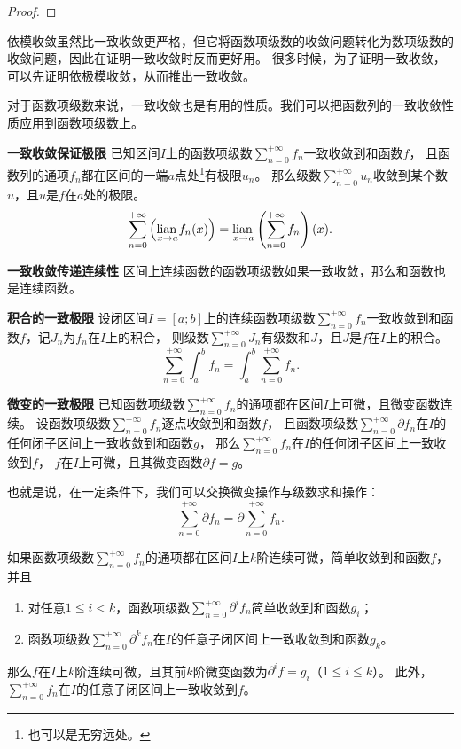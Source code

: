 \documentclass[12pt,UTF8,fontset=none]{ctexbook}
\begin{document}
\begin{appendix}
\begin{proof}
\end{proof}

依模收敛虽然比一致收敛更严格，但它将函数项级数的收敛问题转化为数项级数的收敛问题，因此在证明一致收敛时反而更好用。
很多时候，为了证明一致收敛，可以先证明依极模收敛，从而推出一致收敛。

对于函数项级数来说，一致收敛也是有用的性质。我们可以把函数列的一致收敛性质应用到函数项级数上。

\begin{tm}{\textbf{一致收敛保证极限}}
    已知区间$I$上的函数项级数$\sum_{n=0}^{+\infty} f_n$一致收敛到和函数$f$，
    且函数列的通项$f_n$都在区间的一端$a$点处\footnote{也可以是无穷远处。}有极限$u_n$。
    那么级数$\sum_{n=0}^{+\infty} u_n$收敛到某个数$u$，且$u$是$f$在$a$处的极限。
    $$ \sum_{n=0}^{+\infty} \left(\underset{x\to a}{\operatorname{lian}\,} f_n(x) \right) = \underset{x\to a}{\operatorname{lian}\,} \left(\sum_{n=0}^{+\infty} f_n\right)(x). $$
\end{tm}

\begin{tm}{\textbf{一致收敛传递连续性}}
    区间上连续函数的函数项级数如果一致收敛，那么和函数也是连续函数。
\end{tm}

\begin{tm}{\textbf{积合的一致极限}}
    设闭区间$I=[a;b]$上的连续函数项级数$\sum_{n=0}^{+\infty} f_n$一致收敛到和函数$f$，记$J_n$为$f_n$在$I$上的积合，
    则级数$\sum_{n=0}^{+\infty} J_n$有级数和$J$，且$J$是$f$在$I$上的积合。
    $$ \sum_{n=0}^{+\infty} \int_a^b f_n = \int_a^b \sum_{n=0}^{+\infty} f_n. $$
\end{tm}

\begin{tm}{\textbf{微变的一致极限}}
    已知函数项级数$\sum_{n=0}^{+\infty} f_n$的通项都在区间$I$上可微，且微变函数连续。
    设函数项级数$\sum_{n=0}^{+\infty} f_n$逐点收敛到和函数$f$，
    且函数项级数$\sum_{n=0}^{+\infty} \partial f_n$在$I$的任何闭子区间上一致收敛到和函数$g$，
    那么$\sum_{n=0}^{+\infty} f_n$在$I$的任何闭子区间上一致收敛到$f$，
    $f$在$I$上可微，且其微变函数$\partial f = g$。

    也就是说，在一定条件下，我们可以交换微变操作与级数求和操作：
    $$ \sum_{n=0}^{+\infty} \partial f_n = \partial \sum_{n=0}^{+\infty} f_n. $$
    
    如果函数项级数$\sum_{n=0}^{+\infty} f_n$的通项都在区间$I$上$k$阶连续可微，简单收敛到和函数$f$，并且
    \begin{enumerate}
        \item 对任意$1 \leqslant i < k$，函数项级数$\sum_{n=0}^{+\infty} \partial^i f_n$简单收敛到和函数$g_i$；
        \item 函数项级数$\sum_{n=0}^{+\infty} \partial^k f_n$在$I$的任意子闭区间上一致收敛到和函数$g_k$。
    \end{enumerate}
    那么$f$在$I$上$k$阶连续可微，且其前$k$阶微变函数为$\partial^i f = g_i$（$1 \leqslant i\leqslant k$）。
    此外，$\sum_{n=0}^{+\infty} f_n$在$I$的任意子闭区间上一致收敛到$f$。
\end{tm}


\end{appendix}
\end{document}
